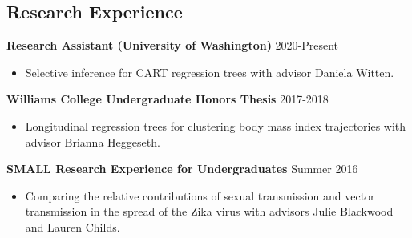 \documentclass[margin, 10pt]{res} %
\begin{document}
\begin{resume}
\section{Research Experience}

{\textbf{Research Assistant (University of Washington)} \hfill 2020-Present
\begin{itemize}
\item Selective inference for CART regression trees with advisor Daniela Witten.
\end{itemize} 

{\textbf{Williams College Undergraduate Honors Thesis}} \hfill 2017-2018 
\begin{itemize}
\item Longitudinal regression trees for clustering body mass index trajectories with advisor Brianna Heggeseth. 
\end{itemize} 

{\textbf{SMALL Research Experience for Undergraduates}} \hfill Summer 2016 
\begin{itemize}
\item Comparing the relative contributions of sexual transmission and vector transmission in the spread of the Zika virus with advisors Julie Blackwood and Lauren Childs. 
\end{itemize} 


}
\end{resume}
\end{document}
